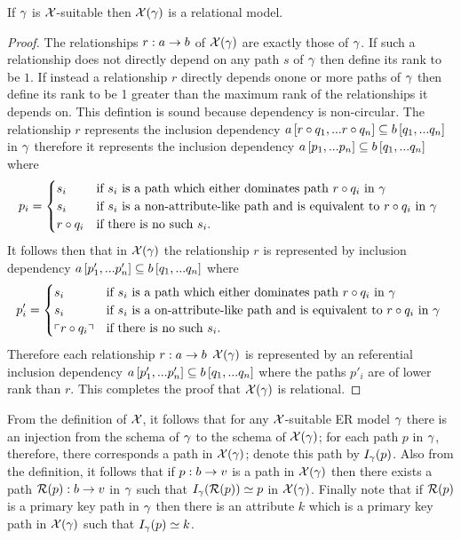 \begin{lemma}
If $\gamma$ is $\mathcal{X}$-suitable then $\mathcal{X}(\gamma)$ is a relational model.
\end{lemma}
\begin{proof}
The relationships $r: a \rightarrow b$ of $\mathcal{X}(\gamma)$ are exactly those of $\gamma$. If such a relationship does not directly depend on any path $s$ of $\gamma$ then define its rank to be $1$.
If instead a relationship $r$ directly depends onone or more paths of $\gamma$ then define its rank to be 1 greater than the maximum rank of the relationships it depends on. 
This defintion is sound because dependency is non-circular.
The relationship $r$ represents the inclusion dependency $a\left[r \circ q_1,...r \circ q_n\right]\subseteq b\left[q_1,...q_n\right]$ in $\gamma$ therefore it represents
the inclusion dependency $a\left[p_1,...p_n\right]\subseteq b\left[q_1,...q_n\right]$ where 
$$
p_i =
\begin{cases} 
    s_i         & \mbox{if $s_i$ is a path which either dominates path $r \circ q_i$ in $\gamma$} \\
    s_i         & \mbox{if $s_i$ is a non-attribute-like path and is equivalent to  $r \circ q_i$ in $\gamma$ }  \\
    r \circ q_i & \mbox{if there is no such $s_i$.}
\end{cases} 
$$
It follows then that in $\mathcal{X}(\gamma)$ the relationship $r$ is represented by inclusion dependency $a\left[p'_1,...p'_n\right]\subseteq b\left[q_1,...q_n\right]$ where
$$
p'_i =
\begin{cases}
   s_i     & \mbox{if $s_i$ is a path which either dominates path $r \circ q_i$ in $\gamma$} \\
   s_i     & \mbox{if $s_i$ is a on-attribute-like path and is equivalent to  $r \circ q_i$ in $\gamma$ }  \\
   \left\ulcorner r \circ q_i\right\urcorner  & \mbox{if there is no such $s_i$.}
\end{cases} 
$$
Therefore each relationship $r: a \rightarrow b$ $\mathcal{X}(\gamma)$ is represented by an referential inclusion dependency $a\left[p'_1,...p'_n\right]\subseteq b\left[q_1,...q_n\right]$
where the paths $p'_i$ are of lower rank than $r$. This completes the proof that $\mathcal{X}(\gamma)$ is relational.
\end{proof}


From the definition of $\mathcal{X}$, it follows that for any $\mathcal{X}$-suitable ER model $\gamma$ there is an injection from the schema of $\gamma$ to the schema of $\mathcal{X}(\gamma)$; for each path $p$ in $\gamma$, therefore, there corresponds a path 
in $\mathcal{X}(\gamma)$; denote this path by  $I_\gamma(p)$. Also from the definition, it follows that
if $p:b \rightarrow v$ is a path in $\mathcal{X}(\gamma)$ then there exists a path $\mathcal{R}(p):b \rightarrow v$ in $\gamma$ such that $I_\gamma(\mathcal{R}(p)) \simeq p$ in $\mathcal{X}(\gamma)$. Finally note that if $\mathcal{R}(p)$ is a primary key path in $\gamma$ then there is an attribute $k$ which is a primary key path
in $\mathcal{X}(\gamma)$ such that $I_\gamma(p) \simeq k$. 




